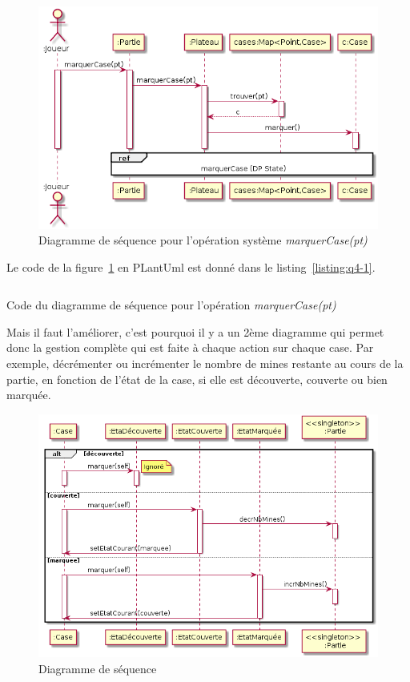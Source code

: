 \documentclass[a4paper,12pt]{article}
\begin{document}
\begin{figure}[htbp]
    \centering
    \includegraphics[width=1\textwidth]{./images/q4-1.png}
    \caption{Diagramme de séquence pour l'opération système \emph{marquerCase(pt)}}
    \label{fig:q4-1}
\end{figure}


Le code de la figure~\ref{fig:q4-1} en PLantUml est donné dans le listing~\ref{listing:q4-1}.

\begin{listing}[ht]
    \inputminted[bgcolor=lightgray!40,linenos=true]{fsharp}{./code-images/q4-1}
    \caption{Code du diagramme de séquence pour l'opération \emph{marquerCase(pt)}}
\end{listing}

\clearpage

Mais il faut l'améliorer, c'est pourquoi il y a un 2ème diagramme qui permet donc la gestion complète qui est faite à chaque action sur chaque case. Par exemple, décrémenter ou incrémenter le nombre de mines restante au cours de la partie, en fonction de l'état de la case, si elle est découverte, couverte ou bien marquée.

\begin{figure}[htbp]
    \centering
    \includegraphics[width=1\textwidth]{./images/q4-2.png}
    \caption{Diagramme de séquence}
    \label{fig:q4-2}
\end{figure}
\end{document}
